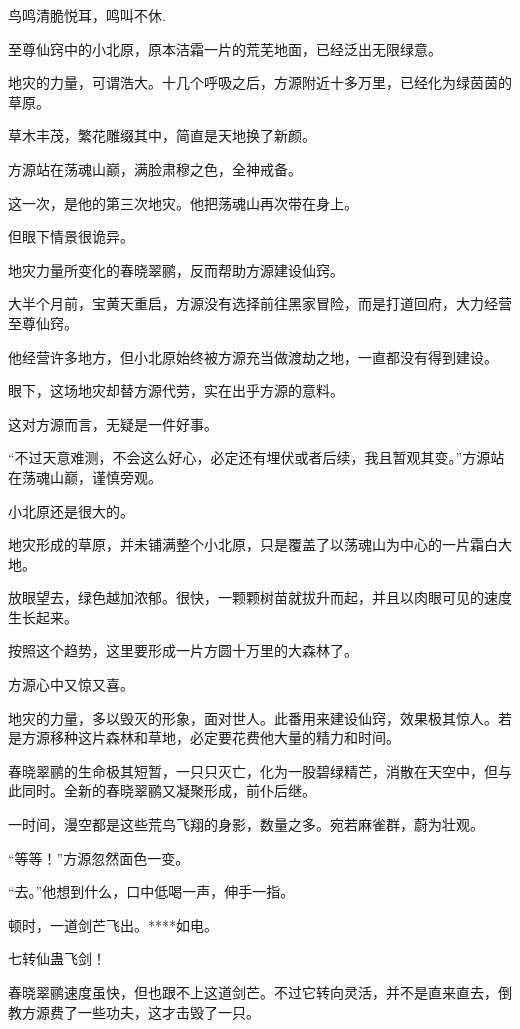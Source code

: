 
\begin{this_body}

鸟鸣清脆悦耳，鸣叫不休.

至尊仙窍中的小北原，原本洁霜一片的荒芜地面，已经泛出无限绿意。

地灾的力量，可谓浩大。十几个呼吸之后，方源附近十多万里，已经化为绿茵茵的草原。

草木丰茂，繁花雕缀其中，简直是天地换了新颜。

方源站在荡魂山巅，满脸肃穆之色，全神戒备。

这一次，是他的第三次地灾。他把荡魂山再次带在身上。

但眼下情景很诡异。

地灾力量所变化的春晓翠鹂，反而帮助方源建设仙窍。

大半个月前，宝黄天重启，方源没有选择前往黑家冒险，而是打道回府，大力经营至尊仙窍。

他经营许多地方，但小北原始终被方源充当做渡劫之地，一直都没有得到建设。

眼下，这场地灾却替方源代劳，实在出乎方源的意料。

这对方源而言，无疑是一件好事。

“不过天意难测，不会这么好心，必定还有埋伏或者后续，我且暂观其变。”方源站在荡魂山巅，谨慎旁观。

小北原还是很大的。

地灾形成的草原，并未铺满整个小北原，只是覆盖了以荡魂山为中心的一片霜白大地。

放眼望去，绿色越加浓郁。很快，一颗颗树苗就拔升而起，并且以肉眼可见的速度生长起来。

按照这个趋势，这里要形成一片方圆十万里的大森林了。

方源心中又惊又喜。

地灾的力量，多以毁灭的形象，面对世人。此番用来建设仙窍，效果极其惊人。若是方源移种这片森林和草地，必定要花费他大量的精力和时间。

春晓翠鹂的生命极其短暂，一只只灭亡，化为一股碧绿精芒，消散在天空中，但与此同时。全新的春晓翠鹂又凝聚形成，前仆后继。

一时间，漫空都是这些荒鸟飞翔的身影，数量之多。宛若麻雀群，蔚为壮观。

“等等！”方源忽然面色一变。

“去。”他想到什么，口中低喝一声，伸手一指。

顿时，一道剑芒飞出。****如电。

七转仙蛊飞剑！

春晓翠鹂速度虽快，但也跟不上这道剑芒。不过它转向灵活，并不是直来直去，倒教方源费了一些功夫，这才击毁了一只。


\end{this_body}

